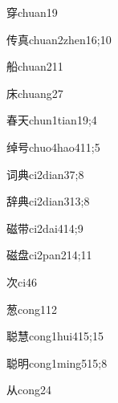 \begin{verbete}{穿}{chuan1}{9}
\end{verbete}
\begin{verbete}{传真}{chuan2zhen1}{6;10}
\end{verbete}
\begin{verbete}{船}{chuan2}{11}
\end{verbete}
\begin{verbete}{床}{chuang2}{7}
\end{verbete}
\begin{verbete}{春天}{chun1tian1}{9;4}
\end{verbete}
\begin{verbete}{绰号}{chuo4hao4}{11;5}
\end{verbete}
\begin{verbete}{词典}{ci2dian3}{7;8}
\end{verbete}
\begin{verbete}{辞典}{ci2dian3}{13;8}
\end{verbete}
\begin{verbete}{磁带}{ci2dai4}{14;9}
\end{verbete}
\begin{verbete}{磁盘}{ci2pan2}{14;11}
\end{verbete}
\begin{verbete}{次}{ci4}{6}
\end{verbete}
\begin{verbete}{葱}{cong1}{12}
\end{verbete}
\begin{verbete}{聪慧}{cong1hui4}{15;15}
\end{verbete}
\begin{verbete}{聪明}{cong1ming5}{15;8}
\end{verbete}
\begin{verbete}{从}{cong2}{4}
\end{verbete}
